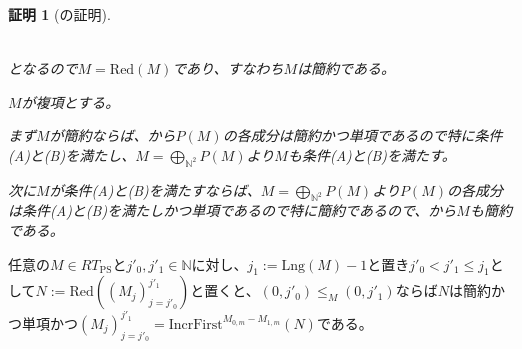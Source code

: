 \documentclass[dvipdfmx,uplatex]{jsarticle}
\theoremstyle{customnonumberbreakfortheorem}
\theoremstyle{customnonumberbreakforproof}
\newtheorem{hideableproof}{証明}
\begin{document}
\begin{hideableproof}[の証明]
\begin{indented}
\begin{indented}
\begin{indented}
\begin{eqnarray*}
				\end{eqnarray*}
				\item となるので\(M = \textrm{Red}(M)\)であり、すなわち\(M\)は簡約である。
			\end{indented}
		\end{indented}
		\item \(M\)が複項とする。
		\begin{indented}
			\item まず\(M\)が簡約ならば、から\(P(M)\)の各成分は簡約かつ単項であるので特に条件(A)と(B)を満たし、\(M = \bigoplus_{\mathbb{N}^2} P(M)\)より\(M\)も条件(A)と(B)を満たす。
			\begin{indented}
				\item 次に\(M\)が条件(A)と(B)を満たすならば、\(M = \bigoplus_{\mathbb{N}^2} P(M)\)より\(P(M)\)の各成分は条件(A)と(B)を満たしかつ単項であるので特に簡約であるので、から\(M\)も簡約である。
			\end{indented}
		\end{indented}
	\end{indented}
\end{hideableproof}

\begin{corollary}\label{直系先祖による切片とRedとIncrFirstの関係}
	任意の\(M \in RT_{\textrm{PS}}\)と\(j'_0,j'_1 \in \mathbb{N}\)に対し、\(j_1 := \textrm{Lng}(M)-1\)と置き\(j'_0 < j'_1 \leq j_1\)として\(N := \textrm{Red}((M_j)_{j=j'_0}^{j'_1})\)と置くと、\((0,j'_0) \leq_M (0,j'_1)\)ならば\(N\)は簡約かつ単項かつ\((M_j)_{j=j'_0}^{j'_1} = \textrm{IncrFirst}^{M_{0,m} - M_{1,m}}(N)\)である\footnotemark{}。
\end{corollary}
\end{document}
